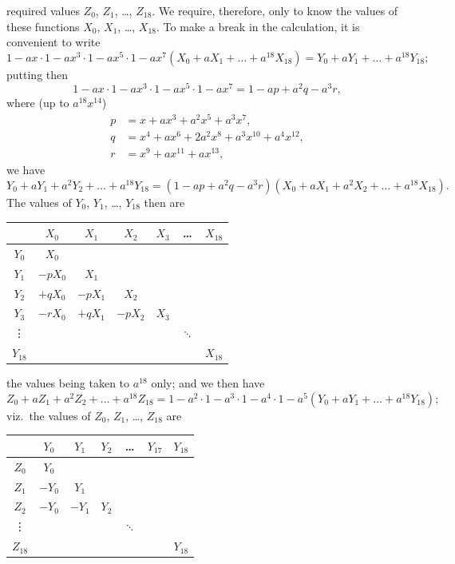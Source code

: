 \documentclass[11pt,a4paper]{book}
\begin{document}
\clearpage
required values $Z_0$, $Z_1$, \dots, $Z_{18}$. We require, therefore, only to know the values of these functions $X_0$, $X_1$, \dots, $X_{18}$. To make a break in the calculation, it is convenient to write
\[
1 - ax \cdot 1 - ax^3 \cdot 1 - ax^5 \cdot 1 - ax^7 (X_0 + aX_1 + \dots + a^{18}X_{18}) = Y_0 + aY_1 + \dots + a^{18}Y_{18};
\]
putting then
\[
1 - ax \cdot 1 - ax^3 \cdot 1 - ax^5 \cdot 1 - ax^7 = 1 - ap + a^2q - a^3r,
\]
where (up to $a^{18}x^{14}$)
\begin{align*}
p &= x + ax^3 + a^2x^5 + a^3x^7, \\
q &= x^4 + ax^6 + 2a^2x^8 + a^3x^{10} + a^4x^{12}, \\
r &= x^9 + ax^{11} + ax^{13},
\end{align*}
we have
\[
Y_0 + aY_1 + a^2Y_2 + \dots + a^{18}Y_{18} = (1 - ap + a^2q - a^3r)(X_0 + aX_1 + a^2X_2 + \dots + a^{18}X_{18}).
\]
The values of $Y_0$, $Y_1$, \dots, $Y_{18}$ then are
\begin{center}
\begin{tabular}{c|cccccc}
& $X_0$ & $X_1$ & $X_2$ & $X_3$ & \dots & $X_{18}$ \\
\hline
$Y_0$ & $X_0$ & & & & & \\
$Y_1$ & $-pX_0$ & $X_1$ & & & & \\
$Y_2$ & $+qX_0$ & $-pX_1$ & $X_2$ & & & \\
$Y_3$ & $-rX_0$ & $+qX_1$ & $-pX_2$ & $X_3$ & & \\
\vdots & & & & & $\ddots$ & \\
$Y_{18}$ & & & & & & $X_{18}$
\end{tabular}
\end{center}
the values being taken to $a^{18}$ only; and we then have
\[
Z_0 + aZ_1 + a^2Z_2 + \dots + a^{18}Z_{18} = 1 - a^2 \cdot 1 - a^3 \cdot 1 - a^4 \cdot 1 - a^5 (Y_0 + aY_1 + \dots + a^{18}Y_{18});
\]
viz.\ the values of $Z_0$, $Z_1$, \dots, $Z_{18}$ are
\begin{center}
\begin{tabular}{c|cccccc}
& $Y_0$ & $Y_1$ & $Y_2$ & \dots & $Y_{17}$ & $Y_{18}$ \\
\hline
$Z_0$ & $Y_0$ & & & & & \\
$Z_1$ & $-Y_0$ & $Y_1$ & & & & \\
$Z_2$ & $-Y_0$ & $-Y_1$ & $Y_2$ & & & \\
\vdots & & & & $\ddots$ & & \\
$Z_{18}$ & & & & & & $Y_{18}$
\end{tabular}
\end{center}
\end{document}
